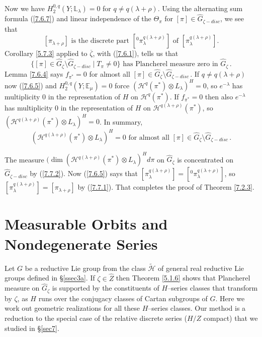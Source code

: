 \documentclass{conm-p-l}
\def\E{\mathbb{E}}
\def\L{\mathbb{L}}
\def\cH{\mathcal{H}}
\begin{document}
Now we have $H_2^{0,q}(Y;\L_\lambda) = 0$ for $q \ne q(\lambda + \rho)$.  Using
the alternating sum formula (\ref{7.6.7}) and linear independence of the 
$\Theta_\pi$ for $[\pi] \in \widehat{G}_{\zeta-disc}$, we see that 
\begin{equation}\label{7.7.1}
[\pi_{\lambda + \rho}] \text{ is the discrete part }
	[{^0\pi}^{q(\lambda + \rho)}_\lambda] 
	\text{ of } [\pi^{q(\lambda + \rho)}_\lambda].
\end{equation}
Corollary \ref{5.7.3} applied to $\overline{\zeta}$, with
(\ref{7.6.1}), tells us that
$$
\{[\pi] \in \widehat{G}_\zeta \setminus \widehat{G}_{\zeta-disc} \mid T_\pi
\ne 0\} \text{ has Plancherel measure zero in } \widehat{G}_\zeta\,.
$$
Lemma \ref{7.6.4} says 
$f_{\pi^*} = 0$ for almost all $[\pi] \in \widehat{G}_\zeta \setminus 
\widehat{G}_{\zeta-disc}$\,.  If $q \ne q(\lambda + \rho)$ now (\ref{7.6.5}) 
and $H^{0,q}_2(Y;\E_\mu) = 0$ force $(\cH^q(\pi^*)\otimes L_\lambda)^H = 0$, so
$e^{-\lambda}$ has multiplicity $0$ in the representation of $H$ on 
$\cH^q(\pi^*)$.  If $f_{\pi^*} = 0$ then also $e^{-\lambda}$ has 
multiplicity $0$ in the representation 
of $H$ on $\cH^{q(\lambda + \rho)}(\pi^*)$, so 
$(\cH^{q(\lambda + \rho)}(\pi^*)\otimes L_\lambda)^H = 0$.  In
summary, 
\begin{equation}\label{7.7.2}
(\cH^{q(\lambda + \rho)}(\pi^*)\otimes L_\lambda)^H = 0
\text{ for almost all } 
[\pi] \in \widehat{G}_\zeta \setminus \widehat{G}_{\zeta-disc}\,.
\end{equation}

The measure $(\dim(\cH^{q(\lambda + \rho)}(\pi^*)\otimes L_\lambda)^Hd\pi$ on
$\widehat{G}_\zeta$ is concentrated on $\widehat{G}_{\zeta-disc}$ by 
(\ref{7.7.2}).  Now (\ref{7.6.5}) says that 
$[\pi_\lambda^{q(\lambda + \rho)}] = 
[{^0\pi}_\lambda^{q(\lambda + \rho)}]$, so
$[\pi_\lambda^{q(\lambda + \rho)}] = [\pi_{\lambda + \rho}]$ by
(\ref{7.7.1}).  That completes the proof of Theorem \ref{7.2.3}.

\section{Measurable Orbits and Nondegenerate Series}\label{sec8}
\setcounter{equation}{0}

Let $G$ be a reductive Lie group from the class $\widetilde{\cH}$ of general
real reductive Lie groups defined in \S \ref{ssec3a}.  If $\zeta \in
\widehat{Z}$ then Theorem \ref{5.1.6} shows that Plancherel measure on
$\widehat{G}_\zeta$ is supported by the constituents of $H$--series
classes that transform by $\zeta$, as $H$ runs over the conjugacy classes
of Cartan subgroups of $G$.  Here we work out geometric realizations for 
all these $H$--series classes.  Our method is a reduction to the special
case of the relative discrete series ($H/Z$ compact) that we studied
in \S \ref{sec7}.
\end{document}
